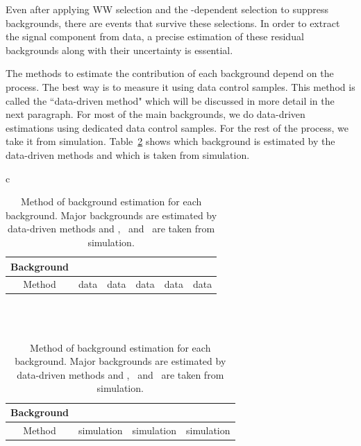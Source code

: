 Even after applying WW selection and the \mHi-dependent selection to suppress 
backgrounds, there are events that survive these selections. In order to extract 
the signal component from data, a precise estimation of these residual backgrounds 
along with their uncertainty is essential. 

The methods to estimate the contribution of each background depend on the process. 
The best way is to measure it using data control samples. This method is 
called the ``data-driven method" which will be discussed in more detail in the next paragraph. 
For most of the main backgrounds, we do data-driven estimations using dedicated
data control samples. For the rest of the process, we take it from simulation.
Table~\ref{tab:overview_bkgest} shows which background is estimated by the
data-driven methods and which is taken from simulation. 

%
\begin{table}[htp] 
\begin{center} 
\vspace{0.5cm}
\begin{tabular}{c}   

\begin{tabular}{c|c|c|c|c|c}   
\hline 
Background     & \qqww & \topbkg & \dyll & \Wjets & \wgammastar  \\
\hline 
\hline 
Method         & data & data & data & data & data \\ 
\hline 
\end{tabular} 
\\
\\
\begin{tabular}{c|c|c|c}   
\hline 
Background     & \ggww & \wgamma & \vv \\
\hline 
\hline 
Method         & simulation & simulation & simulation \\ 
\hline 
\end{tabular} 

\end{tabular} 

\vspace{0.5cm}
\caption{Method of background estimation for each background. Major backgrounds 
are estimated by data-driven methods and  \ggww,  \wgamma\ and  \vv\ are taken 
from simulation.} 
\label{tab:overview_bkgest} 
\end{center} 
\end{table} 


